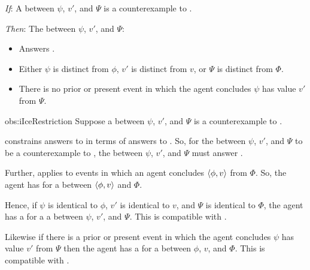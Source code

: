 \begin{note}
  \begin{observation}%
    \label{obs:iIceRestriction}%
    \vspace{-\baselineskip}
    \begin{itenum}
    \item[\emph{If}:]
      A \ros{} between \(\psi\), \(v'\), and \(\Psi\) is a counterexample to \issueInclusion{}.
    \item[\emph{Then}:]
      The \ros{} between \(\psi\), \(v'\), and \(\Psi\):
      \begin{itemize}
      \item
        Answers \qWhy{}.
      \item
        Either \(\psi\) is distinct from \(\phi\), \(v'\) is distinct from \(v\), or \(\Psi\) is distinct from \(\Phi\).
      \item
        There is no prior or present event in which the agent concludes \(\psi\) has value \(v'\) from \(\Psi\).
      \end{itemize}
    \end{itenum}
    \vspace{-1.5\baselineskip}
  \end{observation}
  \begin{motivation}{obs:iIceRestriction}
    \color{blue}
    Suppose a \ros{} between \(\psi\), \(v'\), and \(\Psi\) is a counterexample to \issueInclusion{}.

    \issueInclusion{} constrains answers to \qWhy{} in terms of answers to \qHow{}.
    So, for the \ros{} between \(\psi\), \(v'\), and \(\Psi\) to be a counterexample to \issueInclusion{}, the \ros{} between \(\psi\), \(v'\), and \(\Psi\) must answer \qWhy{}.

    Further, \qWhy{} applies to events in which an agent concludes \(\langle \phi, v \rangle\) from \(\Phi\).
    So, the agent has \wit{} for a \ros{} between \(\langle \phi, v \rangle\) and \(\Phi\).

    Hence, if \(\psi\) is identical to \(\phi\), \(v'\) is identical to \(v\), and \(\Psi\) is identical to \(\Phi\), the agent has a \wit{} for a a \ros{} between \(\psi\), \(v'\), and \(\Psi\).
    This is compatible with \issueInclusion{}.

    Likewise if there is a prior or present event in which the agent concludes \(\psi\) has value \(v'\) from \(\Psi\) then the agent has a \wit{} for a \ros{} between \(\phi\), \(v\), and \(\Phi\).
    This is compatible with \issueInclusion{}.
  \end{motivation}


\end{note}
